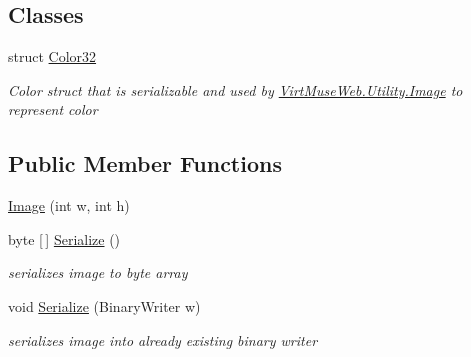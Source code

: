 \subsection*{Classes}
\begin{DoxyCompactItemize}
\item 
struct \mbox{\hyperlink{struct_virt_muse_web_1_1_utility_1_1_image_1_1_color32}{Color32}}
\begin{DoxyCompactList}\small\item\em Color struct that is serializable and used by \mbox{\hyperlink{class_virt_muse_web_1_1_utility_1_1_image}{Virt\+Muse\+Web.\+Utility.\+Image}} to represent color \end{DoxyCompactList}\end{DoxyCompactItemize}
\subsection*{Public Member Functions}
\begin{DoxyCompactItemize}
\item 
\mbox{\hyperlink{class_virt_muse_web_1_1_utility_1_1_image_ae05544069e19310301727b4b9edc917a}{Image}} (int w, int h)
\item 
byte \mbox{[}$\,$\mbox{]} \mbox{\hyperlink{class_virt_muse_web_1_1_utility_1_1_image_ac644e9eaee839b3bc66b48c6a5776118}{Serialize}} ()
\begin{DoxyCompactList}\small\item\em serializes image to byte array \end{DoxyCompactList}\item 
void \mbox{\hyperlink{class_virt_muse_web_1_1_utility_1_1_image_ae0ecd3ea4039b53bfe62c753b0669f2f}{Serialize}} (Binary\+Writer w)
\begin{DoxyCompactList}\small\item\em serializes image into already existing binary writer \end{DoxyCompactList}\end{DoxyCompactItemize}
